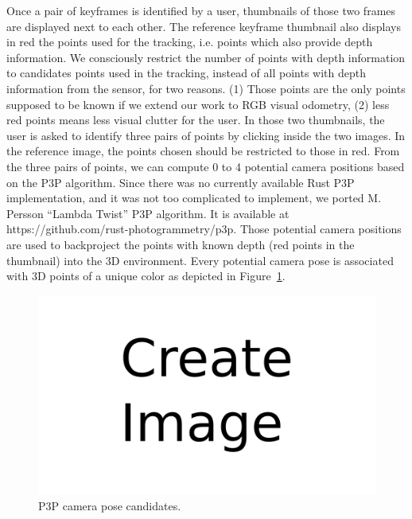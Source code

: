 Once a pair of keyframes is identified by a user,
thumbnails of those two frames are displayed next to each other.
The reference keyframe thumbnail also displays in red the points used for the tracking,
i.e. points which also provide depth information.
We consciously restrict the number of points with depth information to candidates
points used in the tracking, instead of all points with depth information from the sensor,
for two reasons.
(1) Those points are the only points supposed to be known if we extend our work to RGB visual odometry,
(2) less red points means less visual clutter for the user.
In those two thumbnails, the user is asked to identify three pairs of points
by clicking inside the two images.
In the reference image, the points chosen should be restricted to those in red.
From the three pairs of points, we can compute 0 to 4 potential camera positions
based on the P3P algorithm.
Since there was no currently available Rust P3P implementation,
and it was not too complicated to implement, we ported M. Persson ``Lambda Twist''
P3P algorithm. It is available at https://github.com/rust-photogrammetry/p3p.
Those potential camera positions are used to backproject the points with known depth
(red points in the thumbnail) into the 3D environment.
Every potential camera pose is associated with 3D points of a unique color
as depicted in Figure~\ref{fig:p3p}.

\begin{figure}[h]
	\centering
	\includegraphics[width=\linewidth]{assets/img/todo.png}
	\caption{P3P camera pose candidates.}%
	\label{fig:p3p}
\end{figure}


